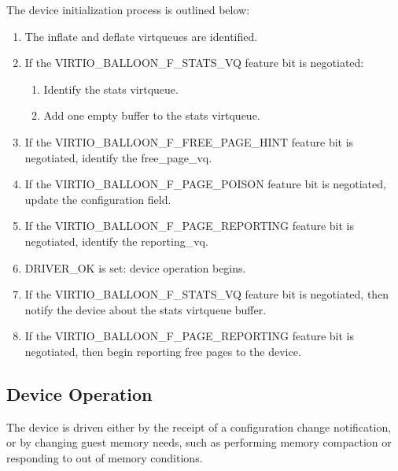 The device initialization process is outlined below:

\begin{enumerate}
\item The inflate and deflate virtqueues are identified.

\item If the VIRTIO_BALLOON_F_STATS_VQ feature bit is negotiated:
  \begin{enumerate}
  \item Identify the stats virtqueue.
  \item Add one empty buffer to the stats virtqueue.
  \end{enumerate}

\item If the VIRTIO_BALLOON_F_FREE_PAGE_HINT feature bit is negotiated,
  identify the free_page_vq.
\item If the VIRTIO_BALLOON_F_PAGE_POISON feature bit is negotiated, update
  the  configuration field.
\item If the VIRTIO_BALLOON_F_PAGE_REPORTING feature bit is negotiated,
  identify the reporting_vq.

\item DRIVER_OK is set: device operation begins.

\item If the VIRTIO_BALLOON_F_STATS_VQ feature bit is negotiated, then
  notify the device about the stats virtqueue buffer.
\item If the VIRTIO_BALLOON_F_PAGE_REPORTING feature bit is negotiated, then
  begin reporting free pages to the device.
\end{enumerate}

\subsection{Device Operation}\label{sec:Device Types / Memory Balloon Device / Device Operation}

The device is driven either by the receipt of a configuration
change notification, or by changing guest memory needs, such as
performing memory compaction or responding to out of memory
conditions.

